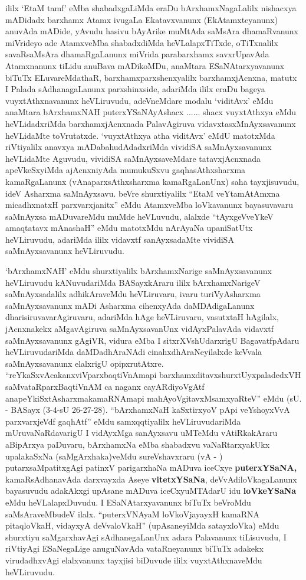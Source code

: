 \begin{artha}
ililx \mdash  `EtaM tamf' eMba shabadxgaLiMda eraDu bArxhamxNagaLalilx nishacxya mADidadx barxhamx Atamx ivugaLa Ekatavxvanunx (EkAtamxteyanunx) anuvAda mADide, yAvudu hasivu bAyArike muMtAda saMsAra dhamaRvanunx miVrideyo ade AtamxveMba shabadxdiMda heVLalapxTiTxde, oTiTxnalilx savaRsaMsAra dhamaRgaLanunx miVrida parabarxhamx savxrUpavAda Atamxnanunx tiLidu anuBava mADikoMDu, anaMtara ESaNAtarxyavanunx biTuTx ELuvareMdathaR, barxhamxparxshenxyalilx barxhamxjAcnxna, matutx I Palada sAdhanagaLanunx parxshinxside, adariMda ililx eraDu bageya vuyxtAthxnavanunx heVLiruvudu, adeVneMdare modalu `viditAvx' eMdu anaMtara bArxhamxNAH puterxYSaNAyAshacx ...... shacx vuyxtAthxya eMdu heVLidadxriMda barxhamxjAcnxnada PalavAgiruva vidavxtasxMnAyxsavanunx heVLidaMte toVrutatxde. `vuyxtAthxya atha viditAvx' eMdU matotxMda riVtiyalilx anavxya mADabahudAdadxriMda vividiSA saMnAyxsavanunx heVLidaMte Aguvudu, vividiSA saMnAyxsaveMdare tatavxjAcnxnada apeVkeSxyiMda ajAcnxniyAda mumukuSxvu gaqhasAthxsharxma kamaRgaLanunx (vAnaparxsAthxsharxma kamaRgaLanUnx) saha tayxjisuvudu, ideV Asharxma saMnAyxsavu. beVre shurxtiyalilx ``EtaM veYtamAtAmxna micadhxnatxH parxvarxjanitx'' eMdu AtamxveMba loVkavanunx bayasuvavaru saMnAyxsa mADuvareMdu muMde heVLuvudu, alalxde ``tAyxgeVveYkeV amaqtatavx mAnashaH'' eMdu matotxMdu nArAyaNa upaniSatUtx heVLiruvudu, adariMda ililx vidavxtf sanAyxsadaMte vividiSA saMnAyxsavanunx heVLiruvudu.
\end{artha}

\begin{artha}
`bArxhamxNAH' \mdash  eMdu shurxtiyalilx bArxhamxNarige saMnAyxsavanunx heVLiruvudu kANuvudariMda BASayxkAraru ililx bArxhamxNarigeV saMnAyxsadalilx adhikAraveMdu heVLiruvaru, ivaru turiVyAsharxma saMnAyxsavanunx mADi Asharxma cihenxyAda daMDAdigaLanunx dharisiruvavarAgiruvaru, adariMda hAge heVLiruvaru, vasutxtaH hAgilalx, jAcnxnakekx aMgavAgiruva saMnAyxsavanUnx vidAyxPalavAda vidavxtf saMnAyxsavanunx  gAgiVR, vidura eMba I sitxrXVshUdarxrigU BagavatfpAdaru heVLiruvudariMda daMDadhAraNAdi cinahxdhAraNeyilalxde keVvala saMnAyxsavanunx elalxrigU opipxrutAtxre. ``reYkaSxvAcakanxviVparxbaqtiVnAmapi barxhamxditavxshurxtUyxpaladedxVH saMvataRparxBaqtiVnAM ca naganx cayARdiyoVgAtf anapeYkiSxtAsharxmakamaRNAmapi mahAyoVgitavxMsamxyaRteV'' eMdu (sU. - BASayx (3-4-sU 26-27-28). ``bArxhamxNaH kaSxtirxyoV pApi veYshoyxVvA parxvarxjeVdf gaqhAtf'' eMdu samxqqtiyalilx heVLiruvudariMda mUruvaNaRdavarigU I vidAyxMga sanAyxsavu uMTeMdu vAtiRkakAraru aBipArxya paDuvaru, bArxhamxNa eMba shabadxvu vaNaRtarxyakUkx upalakaSxNa (saMgArxhaka)veMdu sureVshavxraru (vA - ) putarxsaMpatitxgAgi patinxV parigarxhaNa mADuva iceCxye {\bf puterxYSaNA,} kamaRsAdhanavAda darxvayxda Aseye {\bf vitetxYSaNa}, deVvAdiloVkagaLanunx bayasuvudu adakAkxgi upAsane mADuva iceCxyuMTAdarU idu {\bf loVkeYSaNa} eMdu heVLalapxDuvudu. I ESaNAtarxyavanunx biTuTx beVroMdu saMsAraveMbudeV ilalx. ``puterxVNAyaM loVkoVjayayxH kamaRNA pitaqloVkaH, vidayxyA deVvaloVkaH'' (upAsaneyiMda satayxloVka) eMdu shurxtiyu saMgarxhavAgi sAdhanegaLanUnx adara Palavanunx tiLisuvudu, I riVtiyAgi ESaNegaLige anuguNavAda vataRneyanunx biTuTx adakekx virudadhxvAgi elalxvanunx tayxjisi biDuvude ililx vuyxtAthxnaveMdu heVLiruvudu.
\end{artha}

